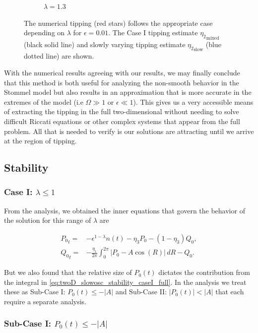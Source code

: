 \begin{figure}[H]
\begin{subfigure}{.5\textwidth}
 \caption{$\lambda=1.3$}
\end{subfigure}
\caption{The numerical tipping (red stars) follows the appropriate case depending on $\lambda$ for $\epsilon=0.01$. The Case I tipping estimate ${\eta_2}_{\text{mixed}}$ (black solid line) and slowly varying tipping estimate ${\eta_2}_{\text{slow}}$ (blue dotted line) are shown.}
\label{fig:twoD_slowosc_epscomp}
\end{figure}

With the numerical results agreeing with our results, we may finally conclude that this method is both useful for analyzing the non-smooth behavior in the Stommel model but also results in an approximation that is more accurate in the extremes of the model (i.e $\Omega \gg 1$ or $\epsilon \ll 1$). This gives us a very accessible means of extracting the tipping in the full two-dimensional without needing to solve difficult Riccati equations or other complex systems that appear from the full problem. All that is needed to verify is our solutions are attracting until we arrive at the region of tipping.

\subsection{Stability}

\subsubsection{Case I: $\lambda\le 1$}

From the analysis, we obtained the inner equations that govern the behavior of the solution for this range of $\lambda$ are

\begin{equation}\label{eq:twoD_slowosc_stability_caseI_full}
\begin{aligned}
{P_0}_t =& -\epsilon^{1-\lambda} n(t)-\eta_3 P_0 -(1-\eta_3)Q_0,\\
{Q_0}_t =& -\frac{\eta_1}{2\pi}\int_0^{2\pi}|P_0-A\cos(R)|\,dR - Q_0.
\end{aligned}
\end{equation}

But we also found that the relative size of $P_0(t)$ dictates the contribution from the integral in \eqref{eq:twoD_slowosc_stability_caseI_full}. In the analysis we treat these as Sub-Case I: $P_0(t)\le-|A|$ and Sub-Case II: $|P_0(t)|<|A|$ that each require a separate analysis.

\subsubsection{Sub-Case I: $P_0(t)\le-|A|$}

